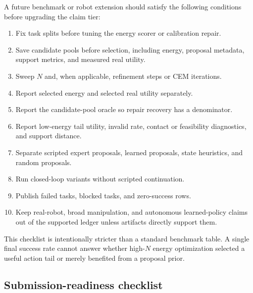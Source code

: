 A future benchmark or robot extension should satisfy the following conditions
before upgrading the claim tier:
\begin{enumerate}
\item Fix task splits before tuning the energy scorer or calibration repair.
\item Save candidate pools before selection, including energy, proposal
metadata, support metrics, and measured real utility.
\item Sweep \(N\) and, when applicable, refinement steps or CEM iterations.
\item Report selected energy and selected real utility separately.
\item Report the candidate-pool oracle so repair recovery has a denominator.
\item Report low-energy tail utility, invalid rate, contact or feasibility
diagnostics, and support distance.
\item Separate scripted expert proposals, learned proposals, state heuristics,
and random proposals.
\item Run closed-loop variants without scripted continuation.
\item Publish failed tasks, blocked tasks, and zero-success rows.
\item Keep real-robot, broad manipulation, and autonomous learned-policy
claims out of the supported ledger unless artifacts directly support them.
\end{enumerate}

This checklist is intentionally stricter than a standard benchmark table. A
single final success rate cannot answer whether high-\(N\) energy optimization
selected a useful action tail or merely benefited from a proposal prior.

\subsection{Submission-readiness checklist}
\label{app:V4-submission-checklist}

